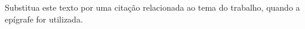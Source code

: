 Substitua este texto por uma citação relacionada ao tema do trabalho, quando a epígrafe for utilizada.
